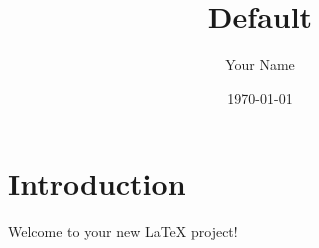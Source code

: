 \documentclass{article}
\title{Default}
\author{Your Name}
\date{\today}
\begin{document}
\maketitle

\section{Introduction}
Welcome to your new LaTeX project!



\end{document}
